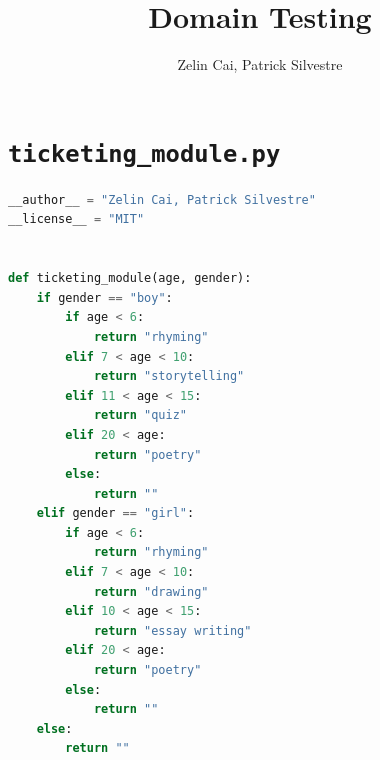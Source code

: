\documentclass[11pt, oneside]{article}   	%
\title{Domain Testing}
\author{Zelin Cai, Patrick Silvestre}
\date{}
\begin{document}
\maketitle

\section{\texttt{ticketing\_module.py}}
\begin{lstlisting}[language=Python]
__author__ = "Zelin Cai, Patrick Silvestre"
__license__ = "MIT"


def ticketing_module(age, gender):
    if gender == "boy":
        if age < 6:
            return "rhyming"
        elif 7 < age < 10:
            return "storytelling"
        elif 11 < age < 15:
            return "quiz"
        elif 20 < age:
            return "poetry"
        else:
            return ""
    elif gender == "girl":
        if age < 6:
            return "rhyming"
        elif 7 < age < 10:
            return "drawing"
        elif 10 < age < 15:
            return "essay writing"
        elif 20 < age:
            return "poetry"
        else:
            return ""
    else:
        return ""
\end{lstlisting}
\newpage
\end{document}
